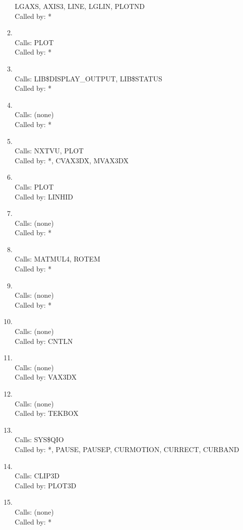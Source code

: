 \documentclass[11pt]{report}
\begin{document}
\begin{enumerate}
LGAXS, AXIS3, LINE, LGLIN, PLOTND
\\ Called by: *
\item {}
\\ Calls:  PLOT
\\ Called by: *
\item {}
\\ Calls: LIB\$DISPLAY\_OUTPUT, LIB\$STATUS
\\ Called by: *
\item {}
\\ Calls:  (none)
\\ Called by: *
\item {}
\\ Calls:  NXTVU, PLOT
\\ Called by: *, CVAX3DX, MVAX3DX
\item {}
\\ Calls:  PLOT
\\ Called by: LINHID
\item {}
\\ Calls:  (none)
\\ Called by: *
\item {}
\\ Calls:  MATMUL4, ROTEM
\\ Called by: *
\item {}
\\ Calls:  (none)
\\ Called by: *
\item {}
\\ Calls:  (none)
\\ Called by: CNTLN
\item {}
\\ Calls:  (none)
\\ Called by: VAX3DX
\item {}
\\ Calls:  (none)
\\ Called by: TEKBOX
\item {}
\\ Calls:  SYS\$QIO
\\ Called by: *, PAUSE, PAUSEP, CURMOTION, CURRECT, CURBAND
\item {}
\\ Calls:  CLIP3D
\\ Called by: PLOT3D
\item {}
\\ Calls:  (none)
\\ Called by: *

\end{enumerate}
\end{document}
